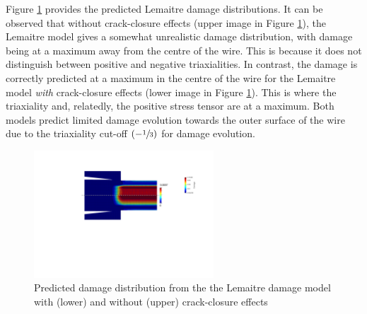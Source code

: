 \documentclass[sn-mathphys,Numbered]{sn-jnl}%
\begin{document}
Figure \ref{fig:lemaitre_wire_draw_damage} provides the predicted Lemaitre damage distributions.
It can be observed that without crack-closure effects (upper image in Figure \ref{fig:lemaitre_wire_draw_damage}), the Lemaitre model gives a somewhat unrealistic damage distribution, with damage being at a maximum away from the centre of the wire.
This is because it does not distinguish between positive and negative triaxialities. 
In contrast, the damage is correctly predicted at a maximum in the centre of the wire for the Lemaitre model \emph{with} crack-closure effects (lower image in Figure \ref{fig:lemaitre_wire_draw_damage}).
This is where the triaxiality and, relatedly, the positive stress tensor are at a maximum.
Both models predict limited damage evolution towards the outer surface of the wire due to the triaxiality cut-off $\left(-\sfrac{1}{3}\right)$ for damage evolution.
\begin{figure}[htbp]
	\centering
	\includegraphics[width=0.6\textwidth]{./Figures/SimulationAndAnalysis/modelCompare/compareLemaitre.pdf}
		\caption{Predicted damage distribution from the the Lemaitre damage model with (lower) and without (upper) crack-closure effects}
	\label{fig:lemaitre_wire_draw_damage}
\end{figure}
\end{document}
